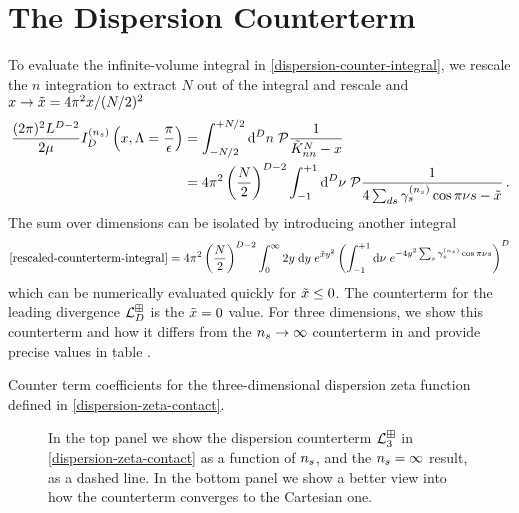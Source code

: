 \section{The Dispersion Counterterm}
\label{sec:dispersion-counterterm}

To evaluate the infinite-volume integral in \eqref{dispersion-counter-integral}, we rescale the $n$ integration to extract $N$ out of the integral and rescale and $x \to \tilde{x} = 4 \pi^2  x/(N/2)^2$
\begin{align}\label{eq:rescaled-counterterm-integral}
	\frac{(2\pi)^2L^{D-2}}{2\mu}
	I_D^{(n_s)}
	\left(x, \Lambda = \frac{\pi}{\epsilon}\right)
	&=
    \int_{-N/2}^{+N/2} \mathrm{d}^Dn\; \mathcal{P} \frac{1}{\tilde K_{nn}^N - x}
    \\ &=
    4\pi^2 \left(\frac{N}{2}\right)^{D-2} \int_{-1}^{+1} \mathrm{d}^D\nu\; \mathcal{P} \frac{1}{4\sum_{ds} \gamma^{({n_s})}_s \cos \pi \nu s - \tilde{x}}
    \, .
\end{align}
The sum over dimensions can be isolated by introducing another integral
\begin{equation}
    \label{eq:dispersion counterterm}
    \eqref{rescaled-counterterm-integral}
    =
    4 \pi^2 \left(\frac{N}{2}\right)^{D-2}\int_{0}^{\infty} 2y\; \mathrm{d}y\; e^{\xtilde y^2}\left(\int_{-1}^{+1} \mathrm{d}\nu\; e^{-4y^2 \sum_s \gamma_s^{(\nstep)} \cos \pi \nu s}\right)^D
\end{equation}
which can be numerically evaluated quickly for $\tilde{x}\leq0$.
The counterterm for the leading divergence $\mathcal{L}_D^{\boxplus}$ is the $\tilde{x}=0$ value.
For three dimensions, we show this counterterm and how it differs from the ${n_s} \to \infty$ counterterm in  and provide precise values in table .
\begin{table}[htb]
    
    \caption{
    	\label{tab:diserpersion-zeta-3d-counterterm-counterterm}
		Counter term coefficients for the three-dimensional dispersion zeta function defined in \eqref{dispersion-zeta-contact}.
    }
\end{table}

\begin{figure}[htb]
    \scalebox{0.9}{}
    \caption{
    	In the top panel we show the dispersion counterterm $\mathcal{L}^{\boxplus}_{3}$ in \eqref{dispersion-zeta-contact} as a function of ${n_s}$, and the ${n_s}=\infty$ result, as a dashed line.
	In the bottom panel we show a better view into how the counterterm converges to the Cartesian one.
    }
    \label{fig:nstep counterterm}
\end{figure}

